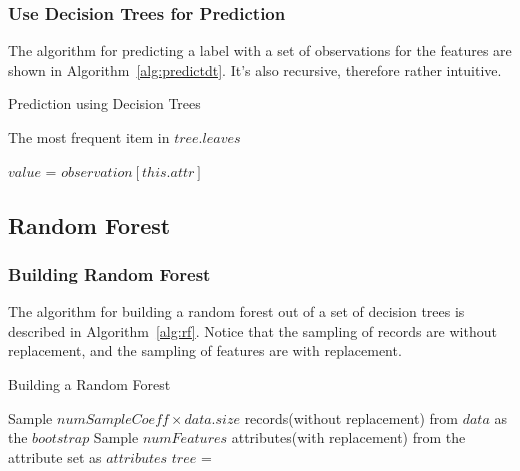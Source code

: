 \documentclass{article}
\begin{document}
\subsubsection{Use Decision Trees for Prediction}

The algorithm for predicting a label with a set of observations for the features are shown in Algorithm~\ref{alg:predictdt}. It's also recursive, therefore rather intuitive.

\begin{algorithm}[H]
	\centering
	\caption{Prediction using Decision Trees}
	\label{alg:predictdt}
	\begin{algorithmic}[1]
		\State\Return The most frequent item in $tree.leaves$
		\EndIf

		\State $value$ = $observation[this.attr]$
		\State \Return {}
		\Else
		\State \Return {}
		\EndIf
		\EndFunction
	\end{algorithmic}
\end{algorithm}

\subsection{Random Forest}

\subsubsection{Building Random Forest}

The algorithm for building a random forest out of a set of decision trees is described in Algorithm~\ref{alg:rf}. Notice that the sampling of records are without replacement, and the sampling of features are with replacement.

\begin{algorithm}[H]
\centering
\caption{Building a Random Forest}
\label{alg:rf}
  \begin{algorithmic}[1]
	    \State Sample $numSampleCoeff \times data.size$ records(without replacement) from $data$ as the $bootstrap$
		    \State Sample $numFeatures$ attributes(with replacement) from the attribute set as $attributes$
		    \State $tree$ = 
	    \EndFor
    \EndFunction
  \end{algorithmic}
\end{algorithm}
\end{document}
